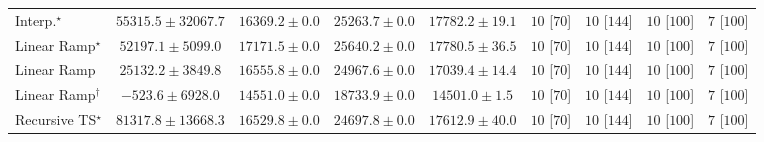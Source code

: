 \begin{tabular}{l|cccc|cccc|}
Interp.$^\star$ & {\cellcolor[HTML]{2F944E}} \color[HTML]{F1F1F1} $55315.5\pm 32067.7$ & {\cellcolor[HTML]{DAF0A4}} \color[HTML]{000000} $16369.2\pm 0.0$ & {\cellcolor[HTML]{B6E192}} \color[HTML]{000000} $25263.7\pm 0.0$ & {\cellcolor[HTML]{D5EEA1}} \color[HTML]{000000} $17782.2\pm 19.1$ & {\cellcolor[HTML]{49006A}} \color[HTML]{F1F1F1} $10$ [$70$] & {\cellcolor[HTML]{49006A}} \color[HTML]{F1F1F1} $10$ [$144$] & {\cellcolor[HTML]{49006A}} \color[HTML]{F1F1F1} $10$ [$100$] & {\cellcolor[HTML]{FFF7F3}} \color[HTML]{000000} $7$ [$100$] \\
Linear Ramp$^\star$ & {\cellcolor[HTML]{389F55}} \color[HTML]{F1F1F1} $52197.1\pm 5099.0$ & {\cellcolor[HTML]{D7EFA2}} \color[HTML]{000000} $17171.5\pm 0.0$ & {\cellcolor[HTML]{B5E092}} \color[HTML]{000000} $25640.2\pm 0.0$ & {\cellcolor[HTML]{D5EEA1}} \color[HTML]{000000} $17780.5\pm 36.5$ & {\cellcolor[HTML]{49006A}} \color[HTML]{F1F1F1} $10$ [$70$] & {\cellcolor[HTML]{49006A}} \color[HTML]{F1F1F1} $10$ [$144$] & {\cellcolor[HTML]{49006A}} \color[HTML]{F1F1F1} $10$ [$100$] & {\cellcolor[HTML]{FFF7F3}} \color[HTML]{000000} $7$ [$100$] \\
Linear Ramp & {\cellcolor[HTML]{B6E192}} \color[HTML]{000000} $25132.2\pm 3849.8$ & {\cellcolor[HTML]{DAF0A4}} \color[HTML]{000000} $16555.8\pm 0.0$ & {\cellcolor[HTML]{B8E293}} \color[HTML]{000000} $24967.6\pm 0.0$ & {\cellcolor[HTML]{D7EFA2}} \color[HTML]{000000} $17039.4\pm 14.4$ & {\cellcolor[HTML]{49006A}} \color[HTML]{F1F1F1} $10$ [$70$] & {\cellcolor[HTML]{49006A}} \color[HTML]{F1F1F1} $10$ [$144$] & {\cellcolor[HTML]{49006A}} \color[HTML]{F1F1F1} $10$ [$100$] & {\cellcolor[HTML]{FFF7F3}} \color[HTML]{000000} $7$ [$100$] \\
Linear Ramp$^\dagger$ & {\cellcolor[HTML]{FCFED3}} \color[HTML]{000000} $-523.6\pm 6928.0$ & {\cellcolor[HTML]{DFF3A8}} \color[HTML]{000000} $14551.0\pm 0.0$ & {\cellcolor[HTML]{D0EC9F}} \color[HTML]{000000} $18733.9\pm 0.0$ & {\cellcolor[HTML]{DFF3A8}} \color[HTML]{000000} $14501.0\pm 1.5$ & {\cellcolor[HTML]{49006A}} \color[HTML]{F1F1F1} $10$ [$70$] & {\cellcolor[HTML]{49006A}} \color[HTML]{F1F1F1} $10$ [$144$] & {\cellcolor[HTML]{49006A}} \color[HTML]{F1F1F1} $10$ [$100$] & {\cellcolor[HTML]{FFF7F3}} \color[HTML]{000000} $7$ [$100$] \\
Recursive TS$^\star$ & {\cellcolor[HTML]{004529}} \color[HTML]{F1F1F1} $81317.8\pm 13668.3$ & {\cellcolor[HTML]{DAF0A4}} \color[HTML]{000000} $16529.8\pm 0.0$ & {\cellcolor[HTML]{B8E293}} \color[HTML]{000000} $24697.8\pm 0.0$ & {\cellcolor[HTML]{D5EEA1}} \color[HTML]{000000} $17612.9\pm 40.0$ & {\cellcolor[HTML]{49006A}} \color[HTML]{F1F1F1} $10$ [$70$] & {\cellcolor[HTML]{49006A}} \color[HTML]{F1F1F1} $10$ [$144$] & {\cellcolor[HTML]{49006A}} \color[HTML]{F1F1F1} $10$ [$100$] & {\cellcolor[HTML]{FFF7F3}} \color[HTML]{000000} $7$ [$100$] \\

\end{tabular}
